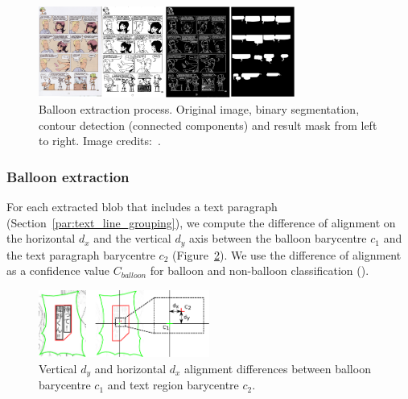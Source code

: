 	\begin{figure}[h!]	%
	  \centering
		\includegraphics[trim= 0px 0px 0px 0px, clip, width=0.75\textwidth]{closed_balloon_process.png}
		\caption[Sequential balloon extraction process illustration]{Balloon extraction process. Original image, binary segmentation, contour detection (connected components) and result mask from left to right. Image credits:~\cite{Midam01}. }
		\label{fig:se:closed_balloon}
	\end{figure}




\subsubsection{Balloon extraction} %
\label{par:balloon_extraction}

For each extracted blob that includes a text paragraph (Section~\ref{par:text_line_grouping}), we compute the difference of alignment on the horizontal $d_x$ and the vertical $d_y$ axis between the balloon barycentre $c_1$ and the text paragraph barycentre $c_2$ (Figure~\ref{fig:se:align_diff}).
We use the difference of alignment as a confidence value $C_{balloon}$ for balloon and non-balloon classification ().

	\begin{figure}[h!]	%
	  \centering
		\includegraphics[trim= 140px 0px 0px 0px, clip, width=0.5\textwidth]{text_balloon_alignment.pdf}
		\caption[Illustration of the vertical and horizontal alignment differences between balloon and text region barycentre]{Vertical $d_y$ and horizontal $d_x$ alignment differences between balloon barycentre $c_1$ and text region barycentre $c_2$.}
		\label{fig:se:align_diff}
	\end{figure}

